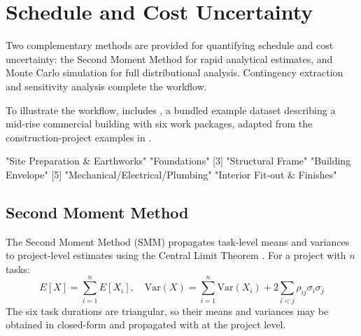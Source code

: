 \documentclass[
]{jss}
\begin{document}
\section{Schedule and Cost Uncertainty}\label{sec-uncertainty}

Two complementary methods are provided for quantifying schedule and cost
uncertainty: the Second Moment Method for rapid analytical estimates,
and Monte Carlo simulation for full distributional analysis. Contingency
extraction and sensitivity analysis complete the workflow.

To illustrate the workflow,  includes ,
a bundled example dataset describing a mid-rise commercial building with
six work packages, adapted from the construction-project examples in
\citet{Damnjanovic2020}.

\begin{CodeChunk}
\begin{CodeOutput}
[1] "Site Preparation & Earthworks"  "Foundations"                   
[3] "Structural Frame"               "Building Envelope"             
[5] "Mechanical/Electrical/Plumbing" "Interior Fit-out & Finishes"   
\end{CodeOutput}
\end{CodeChunk}

\subsection{Second Moment Method}\label{second-moment-method}

The Second Moment Method (SMM) propagates task-level means and variances
to project-level estimates using the Central Limit Theorem
\citep{Benjamin2000}. For a project with \(n\) tasks:
\[E[X] = \sum_{i=1}^{n} E[X_i], \quad
  \text{Var}(X) = \sum_{i=1}^{n}\text{Var}(X_i) + 2\sum_{i<j}\rho_{ij}\sigma_i\sigma_j\]
The six task durations are triangular, so their means and variances may
be obtained in closed-form and propagated with  at the
project level.
\end{document}
